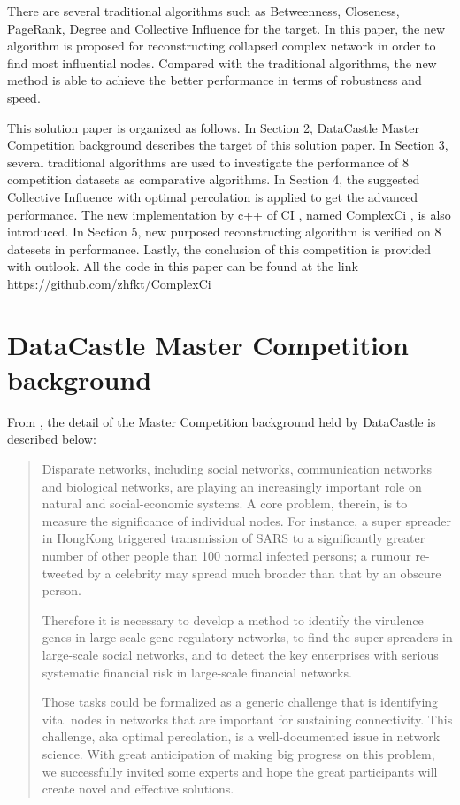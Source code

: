 \documentclass{article}
\newenvironment{itquote}
{\begin{quote}\itshape}
	{\end{quote}\ignorespacesafterend}
\begin{document}
	There are several traditional algorithms such as Betweenness\cite{wikiBetweennesscentrality}, Closeness\cite{wikiClosenesscentrality}, PageRank\cite{wikiPageRank}, Degree\cite{wikiCentrality} and Collective Influence\cite{morone2015influence}\cite{morone2016collective} for the target. In this paper, the new algorithm is proposed for reconstructing collapsed complex network in order to find most influential nodes. Compared with the traditional algorithms, the new method is able to achieve the better performance in terms of robustness and speed. 
	
	This solution paper is organized as follows. In Section 2, DataCastle Master Competition background describes the target of this solution paper. In Section 3, several traditional algorithms are used to investigate the performance of 8 competition datasets as comparative algorithms. In Section 4, the suggested Collective Influence with optimal percolation is applied to get the advanced performance. The new implementation by c++ of CI , named ComplexCi , is also introduced. In Section 5, new purposed reconstructing algorithm is verified on 8 datesets in performance. Lastly, the conclusion of this competition is provided with outlook. All the code in this paper can be found at the link https://github.com/zhfkt/ComplexCi \cite{zhfktgithub} \cite{zhfkt2017887989}



	\section{DataCastle Master Competition background}
	
	From \cite{masterCompetitionbackground} , the detail of the Master Competition background held by DataCastle is described below:
	
	\begin{itquote}
		
		Disparate networks, including social networks, communication networks and biological networks, are playing an increasingly important role on natural and social-economic systems. A core problem, therein, is to measure the significance of individual nodes. For instance, a super spreader in HongKong triggered transmission of SARS to a significantly greater number of other people than 100 normal infected persons; a rumour re-tweeted by a celebrity may spread much broader than that by an obscure person.
		
		Therefore it is necessary to develop a method to identify the virulence genes in large-scale gene regulatory networks, to find the super-spreaders in large-scale social networks, and to detect the key enterprises with serious systematic financial risk in large-scale financial networks.
		
		Those tasks could be formalized as a generic challenge that is identifying vital nodes in networks that are important for sustaining connectivity. This challenge, aka optimal percolation, is a well-documented issue in network science. With great anticipation of making big progress on this problem, we successfully invited some experts and hope the great participants will create novel and effective solutions.  		
	\end{itquote}
\end{document}
